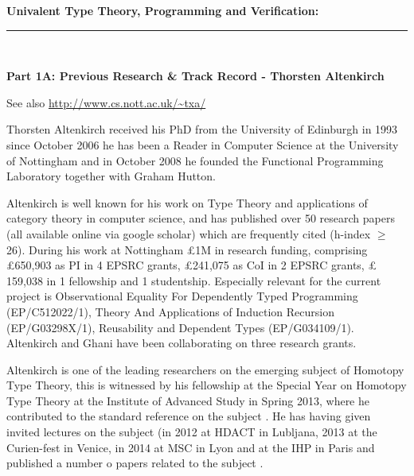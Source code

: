\documentclass[a4paper,11pt]{article}
\begin{document}
\thispagestyle{plain}
\begin{center}
  {\Large {\bf Univalent Type Theory, Programming and Verification:}}\\[1ex] 

\vspace*{-0.1in}

  \rule{140mm}{.5mm}\\[2ex]
\end{center}

\noindent
{\bf \Large Part 1A: Previous Research \& Track Record - 
Thorsten Altenkirch}

\vspace{0.05in}


\noindent
See also \url{http://www.cs.nott.ac.uk/~txa/}

\vspace{0.05in}
Thorsten Altenkirch received his PhD from the University of
Edinburgh in 1993 since October 2006 he has been a Reader in
Computer Science at the University of Nottingham and in October
2008 he founded  the Functional Programming Laboratory together with
Graham Hutton.

Altenkirch is well known for his work on Type Theory and applications
of category theory in computer science, and has published over 50
research papers (all available online via google scholar) which are
frequently cited (h-index $\geq$ 26). During his work at Nottingham
\pounds 1M in research funding, comprising \pounds 650,903 as PI in 4
EPSRC grants, \pounds 241,075 as CoI in 2 EPSRC grants, \pounds
159,038 in 1 fellowship and 1 studentship. Especially relevant for the
current project is Observational Equality For Dependently Typed Programming
(EP/C512022/1), Theory And Applications of Induction Recursion (EP/G03298X/1),
Reusability and Dependent Types (EP/G034109/1). Altenkirch and Ghani have been  collaborating on
three research grants.

Altenkirch is one of the leading researchers on the emerging subject of Homotopy Type Theory,
this is witnessed by his fellowship at the Special Year on Homotopy
Type Theory at the Institute of Advanced Study in Spring 2013, where he contributed to the standard reference on the subject \cite{hott}. 
He has 
having given invited lectures on the subject (in 2012 at HDACT in
Lubljana, 2013 at the Curien-fest in Venice, in 2014 at MSC in Lyon
and at the IHP in Paris and published a number o papers related to the subject 
\cite{alti:lics99,alti:ott-conf,alti:csl12,alti:tlca13-hedberg}.
\end{document}
